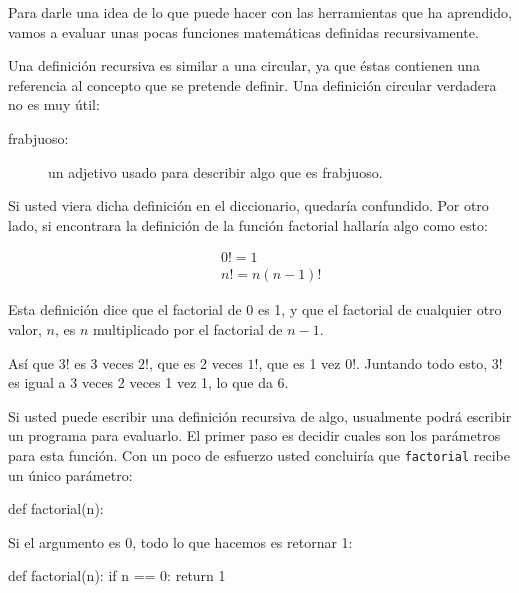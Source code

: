 
Para darle una idea de lo que puede hacer con las herramientas que ha
aprendido, vamos a evaluar unas pocas funciones matemáticas definidas
recursivamente. 

Una definición recursiva es similar a una circular, ya que éstas 
contienen una referencia al concepto que se pretende definir. 
Una definición circular verdadera no es muy útil:

\begin{description}

\item[frabjuoso:] un adjetivo usado para describir algo que es frabjuoso.

\end{description}


Si usted viera dicha definición en el diccionario, quedaría confundido.
Por otro lado, si encontrara la definición de la función factorial 
hallaría algo como esto:

\vspace{-0.35in}
\begin{eqnarray*}
&&  0! = 1 \\
&&  n! = n (n-1)!
\end{eqnarray*}
\vspace{-0.25in}

Esta definición dice que el factorial de 0 es 1, y que el factorial
de cualquier otro valor, $n$, es $n$ multiplicado por el factorial de $n-1$.

Así que $3!$ es 3 veces $2!$, que  es 2 veces $1!$, que es 1 vez
$0!$. Juntando todo esto, $3!$ es igual a 3 veces 2 veces 1 vez 1,
lo que da 6.


Si usted puede escribir una definición recursiva de algo, usualmente
podrá escribir un programa para evaluarlo. El primer paso es decidir
cuales son los parámetros para esta función. Con un poco de esfuerzo
usted concluiría que \texttt{factorial} recibe un único parámetro:

\beforeverb
\begin{pythoncode}
def factorial(n):
\end{pythoncode}
\afterverb
%
Si el argumento es 0, todo lo que hacemos es retornar 1:

\beforeverb
\begin{pythoncode}
def factorial(n):
  if n == 0:
    return 1
\end{pythoncode}
\afterverb
%

